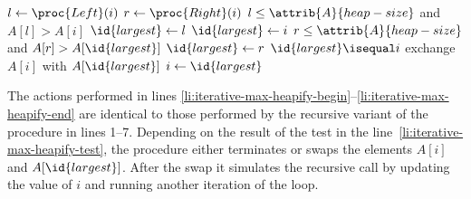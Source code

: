 \indent\begin{codebox}
\li \While {}
\li     \Do $l\gets\proc{Left}(i)$ \label{li:iterative-max-heapify-begin}
\li         $r\gets\proc{Right}(i)$
\li         \If $l\le\attrib{A}{heap-size}$ and $A[l]>A[i]$
\li             \Then $\id{largest}\gets l$
\li             \Else $\id{largest}\gets i$
                \End
\li         \If $r\le\attrib{A}{heap-size}$ and $A[r]>A[\id{largest}]$
\li             \Then $\id{largest}\gets r$
                \End \label{li:iterative-max-heapify-end}
\li         \If $\id{largest}\isequal i$ \label{li:iterative-max-heapify-test}
\li             \Then \Return
                \End
\li         exchange $A[i]$ with $A[\id{largest}]$
\li         $i\gets\id{largest}$
        \End
\end{codebox}

The actions performed in lines \ref{li:iterative-max-heapify-begin}--\ref{li:iterative-max-heapify-end} are identical to those performed by the recursive variant of the procedure in lines 1--7.
Depending on the result of the test in the line~\ref{li:iterative-max-heapify-test}, the procedure either terminates or swaps the elements $A[i]$ and $A[\id{largest}]$.
After the swap it simulates the recursive call by updating the value of $i$ and running another iteration of the  loop.
